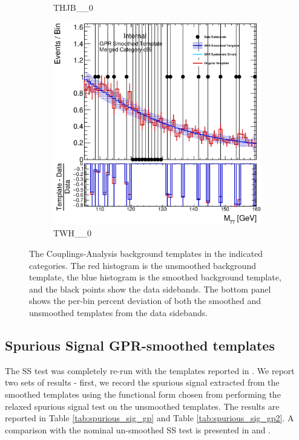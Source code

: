 \begin{figure}
\begin{center}
\begin{subfigure}[T]{0.49\linewidth}
	\caption{THJB\_\_0}
\end{subfigure}
\begin{subfigure}[T]{0.49\linewidth}
	\centering
	\includegraphics[width=\linewidth]{figures/background/gpr/coupCatTemplates/GPR_Smoothed_Plot_hmgg_c89.eps}
	\caption{TWH\_\_0}
\end{subfigure}
\caption{The Couplings-Analysis background templates in the indicated categories. The red histogram is the unsmoothed background template, the blue histogram is the smoothed background template, and the black points show the data sidebands. The bottom panel shows the per-bin percent deviation of both the smoothed and unsmoothed templates from the data sidebands. }
 \label{fig:gpr_coupcat_22}
 \end{center}
\end{figure}

\subsection{Spurious Signal GPR-smoothed templates}
\label{ssec:GPR_SS}

The SS test was completely re-run with the templates reported in \Figrange{\ref{fig:gpr_coupcat_1}}{\ref{fig:gpr_coupcat_22}}. 
We report two sets of results - first, we record the spurious signal extracted from the smoothed templates using the functional form chosen from performing the relaxed spurious signal test on the unsmoothed templates. The results are reported in Table \ref{tab:spurious_sig_gp} and Table \ref{tab:spurious_sig_gp2}. A comparison with the nominal un-smoothed SS test is presented in \Tab{\ref{tab:comp_smooth_unsmooth1}} and \Tab{\ref{tab:comp_smooth_unsmooth2}}.

